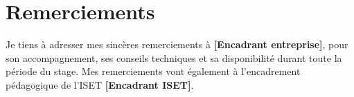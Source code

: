 \chapter*{Remerciements}

Je tiens à adresser mes sincères remerciements à \textbf{[Encadrant entreprise]}, pour son accompagnement, ses conseils techniques et sa disponibilité durant toute la période du stage. Mes remerciements vont également à l'encadrement pédagogique de l'ISET \textbf{[Encadrant ISET]}.
